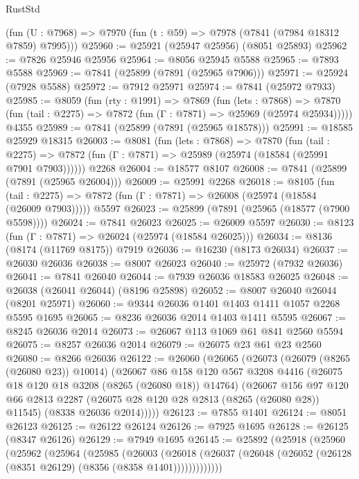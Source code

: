 \begin{lexlean}{RustStd}
\begin{coremodule}
    (fun (U : @7968) => @7970 (fun (t : @59) => @7978 (@7841 (@7984 @18312 @7859) @7995)))
@25960 := @25921 (@25947 @25956) (@8051 @25893)
@25962 := @7826 @25946 @25956
@25964 := @8056 @25945 @5588
@25965 := @7893 @5588
@25969 := @7841 (@25899 (@7891 (@25965 @7906)))
@25971 := @25924 (@7928 @5588)
@25972 := @7912 @25971
@25974 := @7841 (@25972 @7933)
@25985 := @8059
    (fun (rty : @1991) =>
    @7869
      (fun (lets : @7868) =>
      @7870 (fun (tail : @2275) => @7872 (fun (Γ : @7871) => @25969 (@25974 @25934)))))
    @4355
@25989 := @7841 (@25899 (@7891 (@25965 @18578)))
@25991 := @18585 @25929 @18315
@26003 := @8081
    (fun (lets : @7868) =>
    @7870
      (fun (tail : @2275) =>
      @7872 (fun (Γ : @7871) => @25989 (@25974 (@18584 (@25991 @7901 @7903))))))
    @2268
@26004 := @18577 @8107
@26008 := @7841 (@25899 (@7891 (@25965 @26004)))
@26009 := @25991 @2268
@26018 := @8105
    (fun (tail : @2275) => @7872 (fun (Γ : @7871) => @26008 (@25974 (@18584 (@26009 @7903)))))
    @5597
@26023 := @25899 (@7891 (@25965 (@18577 (@7900 @5598))))
@26024 := @7841 @26023
@26025 := @26009 @5597
@26030 := @8123 (fun (Γ : @7871) => @26024 (@25974 (@18584 @26025)))
@26034 := @8136 (@8174 (@11769 @8175)) @7919
@26036 := @16230 (@8173 @26034)
@26037 := @26030 @26036
@26038 := @8007 @26023
@26040 := @25972 (@7932 @26036)
@26041 := @7841 @26040
@26044 := @7939 @26036 @18583 @26025
@26048 := @26038 (@26041 @26044) (@8196 @25898)
@26052 := @8007 @26040 @26044 (@8201 @25971)
@26060 := @9344 @26036 @1401 @1403 @1411 @1057 @2268 @5595 @1695
@26065 := @8236 @26036 @2014 @1403 @1411 @5595
@26067 := @8245 @26036 @2014
@26073 := @26067 @113 @1069 @61 @841 @2560 @5594
@26075 := @8257 @26036 @2014
@26079 := @26075 @23 @61 @23 @2560
@26080 := @8266 @26036
@26122 := @26060
    (@26065
      (@26073
        (@26079 (@8265 (@26080 @23)) @10014)
        (@26067
          @86
          @158
          @120
          @567
          @3208
          @4416
          (@26075 @18 @120 @18 @3208 (@8265 (@26080 @18)) @14764)
          (@26067
            @156
            @97
            @120
            @66
            @2813
            @2287
            (@26075 @28 @120 @28 @2813 (@8265 (@26080 @28)) @11545)
            (@8338 @26036 @2014)))))
@26123 := @7855 @1401
@26124 := @8051 @26123
@26125 := @26122 @26124
@26126 := @7925 @1695
@26128 := @26125 (@8347 @26126)
@26129 := @7949 @1695
@26145 := @25892
    (@25918
      (@25960
        (@25962
          (@25964
            (@25985
              (@26003
                (@26018
                  (@26037 (@26048 (@26052 (@26128 (@8351 @26129) (@8356 (@8358 @1401)))))))))))))

\end{coremodule}
\end{lexlean}
